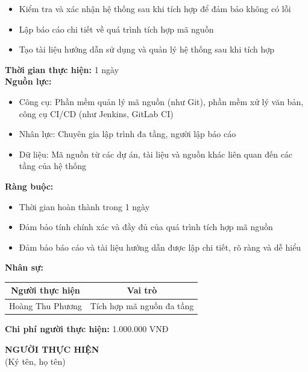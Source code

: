 {\begin{minipage}{\textwidth}
\begin{itemize}
        \item Kiểm tra và xác nhận hệ thống sau khi tích hợp để đảm bảo không có lỗi
        \item Lập báo cáo chi tiết về quá trình tích hợp mã nguồn
        \item Tạo tài liệu hướng dẫn sử dụng và quản lý hệ thống sau khi tích hợp
    \end{itemize}
    \vspace{0.5cm}
    \noindent \textbf{Thời gian thực hiện:} 1 ngày \\
    \noindent \textbf{Nguồn lực:}
    \begin{itemize}
        \item Công cụ: Phần mềm quản lý mã nguồn (như Git), phần mềm xử lý văn bản, công cụ CI/CD (như Jenkins, GitLab CI)
        \item Nhân lực: Chuyên gia lập trình đa tầng, người lập báo cáo
        \item Dữ liệu: Mã nguồn từ các dự án, tài liệu và nguồn khác liên quan đến các tầng của hệ thống
    \end{itemize}
    \vspace{0.5cm}
    \noindent \textbf{Ràng buộc:}
    \begin{itemize}
        \item Thời gian hoàn thành trong 1 ngày
        \item Đảm bảo tính chính xác và đầy đủ của quá trình tích hợp mã nguồn
        \item Đảm bảo báo cáo và tài liệu hướng dẫn được lập chi tiết, rõ ràng và dễ hiểu
    \end{itemize}
    \vspace{0.5cm}
    \noindent \textbf{Nhân sự:}
    \begin{longtable}{|c|c|}
    \hline
    \textbf{Người thực hiện} & \textbf{Vai trò} \\
    \hline
    Hoàng Thu Phương & Tích hợp mã nguồn đa tầng \\
    \hline
    \end{longtable}
    \vspace{0.5cm}
    \noindent \textbf{Chi phí người thực hiện:} 1.000.000 VNĐ \\
    \vspace{1cm}
    \begin{flushleft}
        \hspace{8cm} \textbf{NGƯỜI THỰC HIỆN} \\
        \hspace{8.8cm} (Ký tên, họ tên) \\
        \vspace{1cm}
    \end{flushleft}
    \end{minipage}
}
% 
